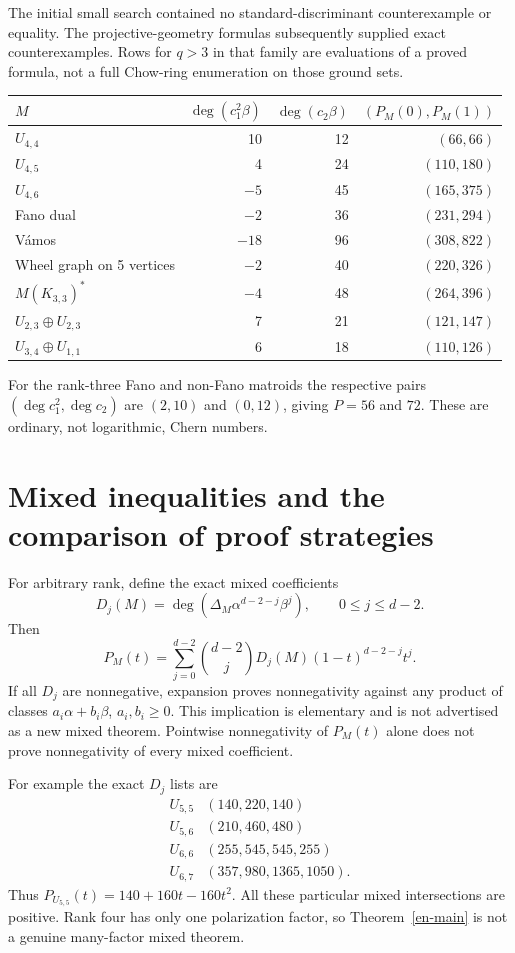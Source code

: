 \documentclass[12pt]{amsart}
\theoremstyle{definition}
\theoremstyle{remark}
\numberwithin{equation}{section}
\begin{document}
The initial small search contained no standard-discriminant counterexample or equality. The projective-geometry formulas subsequently supplied exact counterexamples. Rows for $q>3$ in that family are evaluations of a proved formula, not a full Chow-ring enumeration on those ground sets.

\begin{center}\small
\begin{tabular}{lrrr}
\toprule
$M$&$\deg(c_1^2\beta)$&$\deg(c_2\beta)$&$(P_M(0),P_M(1))$\\\midrule
$U_{4,4}$&10&12&$(66,66)$\\
$U_{4,5}$&4&24&$(110,180)$\\
$U_{4,6}$&$-5$&45&$(165,375)$\\
Fano dual&$-2$&36&$(231,294)$\\
V\'amos&$-18$&96&$(308,822)$\\
Wheel graph on 5 vertices&$-2$&40&$(220,326)$\\
$M(K_{3,3})^*$&$-4$&48&$(264,396)$\\
$U_{2,3}\oplus U_{2,3}$&7&21&$(121,147)$\\
$U_{3,4}\oplus U_{1,1}$&6&18&$(110,126)$\\
\bottomrule
\end{tabular}
\end{center}
For the rank-three Fano and non-Fano matroids the respective pairs $(\deg c_1^2,\deg c_2)$ are $(2,10)$ and $(0,12)$, giving $P=56$ and $72$. These are ordinary, not logarithmic, Chern numbers.

\section{Mixed inequalities and the comparison of proof strategies}
For arbitrary rank, define the exact mixed coefficients
\[
 D_j(M)=\deg(\Delta_M\alpha^{d-2-j}\beta^j),\qquad 0\leq j\leq d-2.
\]
Then
\begin{equation}\label{en-bernstein}
 P_M(t)=\sum_{j=0}^{d-2}\binom{d-2}{j}D_j(M)(1-t)^{d-2-j}t^j.
\end{equation}
If all $D_j$ are nonnegative, expansion proves nonnegativity against any product of classes $a_i\alpha+b_i\beta$, $a_i,b_i\geq0$. This implication is elementary and is not advertised as a new mixed theorem. Pointwise nonnegativity of $P_M(t)$ alone does not prove nonnegativity of every mixed coefficient.

For example the exact $D_j$ lists are
\[
\begin{array}{c|l}
U_{5,5}&(140,220,140)\\
U_{5,6}&(210,460,480)\\
U_{6,6}&(255,545,545,255)\\
U_{6,7}&(357,980,1365,1050).
\end{array}
\]
Thus $P_{U_{5,5}}(t)=140+160t-160t^2$. All these particular mixed intersections are positive. Rank four has only one polarization factor, so Theorem~\ref{en-main} is not a genuine many-factor mixed theorem.
\end{document}
